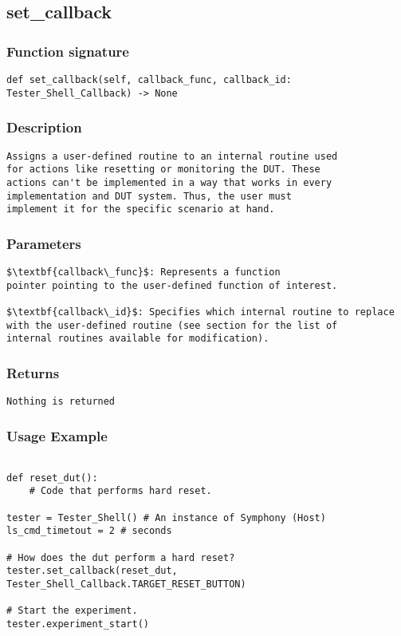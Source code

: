 \subsection{set\_callback}
\label{func:set_callback}
\subsubsection{Function signature}
\begin{lstlisting}
def set_callback(self, callback_func, callback_id: Tester_Shell_Callback) -> None
\end{lstlisting}

\subsubsection{Description}
\begin{lstlisting}[mathescape=true, keywordstyle=\color{black}, showstringspaces=false]
Assigns a user-defined routine to an internal routine used 
for actions like resetting or monitoring the DUT. These 
actions can't be implemented in a way that works in every 
implementation and DUT system. Thus, the user must 
implement it for the specific scenario at hand.
\end{lstlisting}

\subsubsection{Parameters}
\begin{lstlisting}[mathescape=true, keywordstyle=\color{black}]
$\textbf{callback\_func}$: Represents a function 
pointer pointing to the user-defined function of interest.

$\textbf{callback\_id}$: Specifies which internal routine to replace 
with the user-defined routine (see section for the list of 
internal routines available for modification).
\end{lstlisting}

\subsubsection{Returns}
\begin{lstlisting}[mathescape=true, keywordstyle=\color{black}]
Nothing is returned
\end{lstlisting}


\subsubsection{Usage Example}
\begin{lstlisting}

def reset_dut():
    # Code that performs hard reset.

tester = Tester_Shell() # An instance of Symphony (Host)
ls_cmd_timetout = 2 # seconds

# How does the dut perform a hard reset?
tester.set_callback(reset_dut, Tester_Shell_Callback.TARGET_RESET_BUTTON)

# Start the experiment.
tester.experiment_start()
\end{lstlisting}
